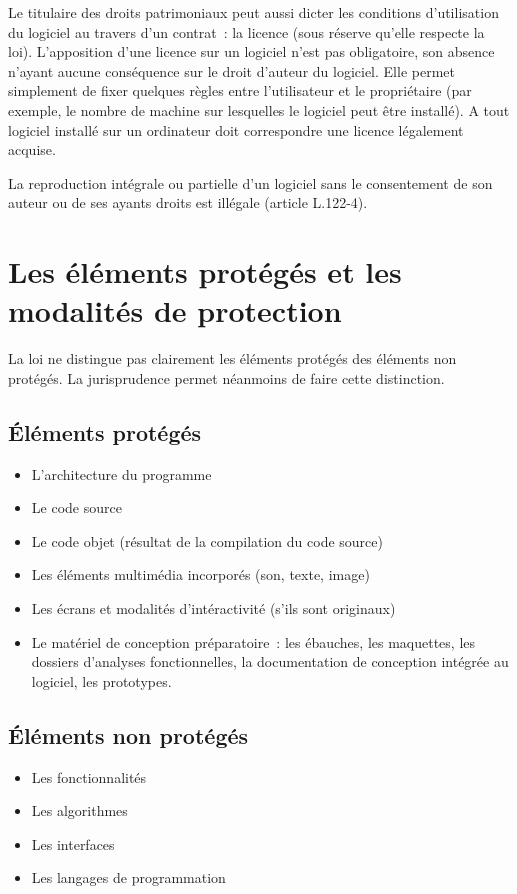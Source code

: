\documentclass{report}
\begin{document}
Le titulaire des droits patrimoniaux peut aussi dicter les conditions d'utilisation du logiciel au travers d'un contrat~: la licence (sous réserve qu'elle respecte la loi). L'apposition d'une licence sur un logiciel n'est pas obligatoire, son absence n'ayant aucune conséquence sur le droit d'auteur du logiciel. Elle permet simplement de fixer quelques règles entre l'utilisateur et le propriétaire (par exemple, le nombre de machine sur lesquelles le logiciel peut être installé). A tout logiciel installé sur un ordinateur doit correspondre une licence légalement acquise.

La reproduction intégrale ou partielle d'un logiciel sans le consentement de son auteur ou de ses ayants droits est illégale (article L.122-4).

\section{Les éléments protégés et les modalités de protection}
La loi ne distingue pas clairement les éléments protégés des éléments non protégés. La jurisprudence permet néanmoins de faire cette distinction.

\subsection{Éléments protégés}
\begin{itemize}
\item L'architecture du programme
\item Le code source
\item Le code objet (résultat de la compilation du code source)
\item Les éléments multimédia incorporés (son, texte, image)
\item Les écrans et modalités d'intéractivité (s'ils sont originaux)
\item Le matériel de conception préparatoire~: les ébauches, les maquettes, les dossiers d'analyses fonctionnelles, la documentation de conception intégrée au logiciel, les prototypes.
\end{itemize}

\subsection{Éléments non protégés}
\begin{itemize}
\item Les fonctionnalités
\item Les algorithmes
\item Les interfaces
\item Les langages de programmation
\end{itemize}
\end{document}
